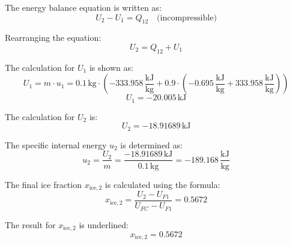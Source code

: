 The energy balance equation is written as:  
\[
U_2 - U_1 = Q_{12} \quad \text{(incompressible)}
\]  

Rearranging the equation:  
\[
U_2 = Q_{12} + U_1
\]  

The calculation for \( U_1 \) is shown as:  
\[
U_1 = m \cdot u_1 = 0.1 \, \text{kg} \cdot \left( -333.958 \, \frac{\text{kJ}}{\text{kg}} + 0.9 \cdot (-0.695 \, \frac{\text{kJ}}{\text{kg}} + 333.958 \, \frac{\text{kJ}}{\text{kg}}) \right)
\]  
\[
U_1 = -20.005 \, \text{kJ}
\]  

The calculation for \( U_2 \) is:  
\[
U_2 = -18.91689 \, \text{kJ}
\]  

The specific internal energy \( u_2 \) is determined as:  
\[
u_2 = \frac{U_2}{m} = \frac{-18.91689 \, \text{kJ}}{0.1 \, \text{kg}} = -189.168 \, \frac{\text{kJ}}{\text{kg}}
\]  

The final ice fraction \( x_{\text{ice},2} \) is calculated using the formula:  
\[
x_{\text{ice},2} = \frac{U_2 - U_{F1}}{U_{FC} - U_{F1}} = 0.5672
\]  

The result for \( x_{\text{ice},2} \) is underlined:  
\[
x_{\text{ice},2} = 0.5672
\]